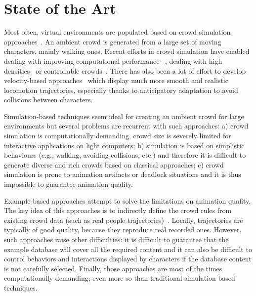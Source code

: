 \section{State of the Art}
\label{sec:star}

Most often, virtual environments are populated based on crowd simulation approaches~\cite{ThalmannBook:2013}.
An ambient crowd is generated from a large set of moving characters, mainly walking ones.
Recent efforts in crowd simulation have enabled dealing with improving computational performance ~\cite{PettreCAVW:2006,Treuille:2006}, dealing with high densities~\cite{Narain:2009} or controllable crowds~\cite{Guy:2009}.
There has also been a lot of effort to develop velocity-based approaches~\cite{Paris:2007,VanDenBerg:2008} which display much more smooth and realistic locomotion trajectories, especially thanks to anticipatory adaptation to avoid collisions between characters.  


Simulation-based techniques seem ideal for creating an ambient crowd for large environments but several problems are recurrent with such approaches:
a) crowd simulation is computationally demanding, crowd size is severely limited for interactive applications on light computers;
b) simulation is based on simplistic behaviours (e.g., walking, avoiding collisions, etc.) and therefore it is difficult to generate diverse and rich crowds based on classical approaches;
c) crowd simulation is prone to animation artifacts or deadlock situations and it is thus impossible to guarantee animation quality. 

Example-based approaches attempt to solve the limitations on animation quality.
The key idea of this approaches is to indirectly define the crowd rules from existing crowd data (such as real people trajectories)~\cite{Lerner:2007,Ju:2010,Charalambous:2014}.
Locally, trajectories are typically of good quality, because they reproduce real recorded ones.
However, such approaches raise other difficulties: it is difficult to guarantee that the example database will cover all the required content and it can also be difficult to control behaviors and interactions displayed by characters if the database content is not carefully selected.
Finally, those approaches are most of the times computationally demanding; even more so than traditional simulation based techniques.

